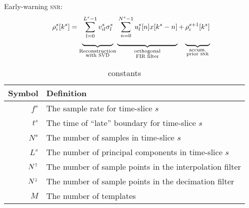 \documentclass[letterpaper,11pt]{article}
\begin{document}
Early-warning \textsc{snr}:
\newcommand{\mystrut}{\rule[-2em]{0pt}{0pt}}  %
\begin{equation}
    \rho^{s}_i[k^{s}] = \underbrace{\mystrut\sum_{l=0}^{L^{s}-1} v^{s}_{il} \sigma^{s}_l}_{\substack{\text{Reconstruction}\\ \text{with {\sc SVD}}}}
    \underbrace{\mystrut\sum_{n=0}^{N^{s} - 1} u^{s}_{l}[n] x[k^{s}-n]}_{\substack{\text{orthogonal}\\ \text{{\sc FIR} filter}}} + 
    \underbrace{\mystrut\rho^{s+1}_i[k^{s}]}_{\substack{\text{accum.}\\ \text{prior {\sc snr}}}}
\end{equation}

\begin{table}
\begin{tabular}{rl}
\hline
\textbf{Symbol} & \textbf{Definition} \\\hline
$f^{s}$ & The sample rate for time-slice $s$\\
$t^{s}$ & The time of ``late'' boundary for time-slice $s$\\
$N^{s}$ & The number of samples in time-slice $s$\\
$L^{s}$ & The number of principal components in time-slice $s$\\
$N^\shortuparrow$ & The number of sample points in the interpolation filter\\
$N^\shortdownarrow$ & The number of sample points in the decimation filter\\
$M$ & The number of templates\\
\hline
\end{tabular}
\caption{constants}
\end{table}
\end{document}
